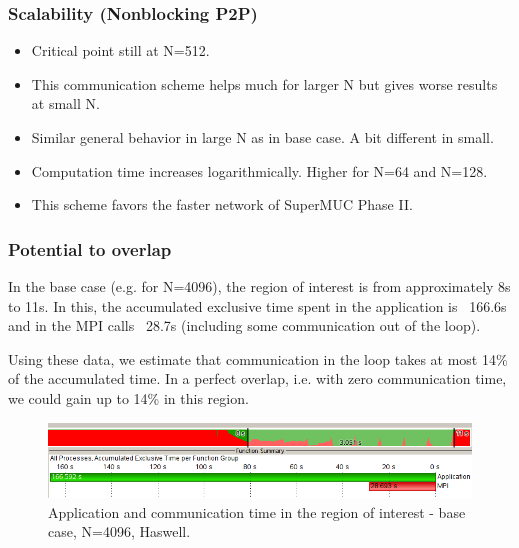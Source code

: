 \documentclass[10pt, compress]{beamer}
\begin{document}
\begin{frame}
  \frametitle{Scalability (Nonblocking P2P)}
  \begin{itemize}
  \item Critical point still at N=512.
  \item This communication scheme helps much for larger N but gives worse results at small N.
  \item Similar general behavior in large N as in base case. A bit different in small.
  \item Computation time increases logarithmically. Higher for N=64 and N=128.
  \item This scheme favors the faster network of SuperMUC Phase II.
  \end{itemize}
\end{frame}

\begin{frame}
  \frametitle{Potential to overlap}
  In the base case (e.g. for N=4096), the region of interest is from approximately 8s to 11s. In this, the accumulated exclusive time spent in the application is ~166.6s and in the MPI calls ~28.7s (including some communication out of the loop). 
   
  Using these data, we estimate that communication in the loop takes at most 14\% of the accumulated time. In a perfect overlap, i.e. with zero communication time, we could gain up to 14\% in this region.
  \begin{figure}
  \centering
  \includegraphics[width=\textwidth]{images/overlap.png}
  \caption{Application and communication time in the region of interest - base case, N=4096, Haswell.}
  \label{fig:overlap_base}
  \end{figure}
\end{frame}
\end{document}
